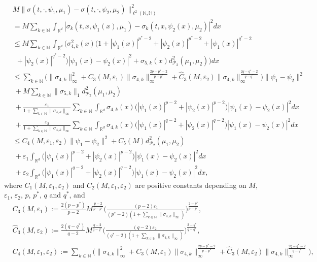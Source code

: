 \documentclass[11pt]{article}
\renewcommand{\leq}{\leqslant}
\numberwithin{equation}{section}
\begin{document}
\begin{align}\label{h2--}
&M\|\sigma(t,\cdot,\psi_1,\mu_1)-
\sigma(t,\cdot,\psi_2,\mu_2)
\|^2_{
\ell^2(\mathbb{N},
\mathbb{H})}
\nonumber\\
&=M\sum_{k\in\mathbb{N}}\int_{\mathbb{R}^d}
|\sigma_k(t,x,\psi_1(x),\mu_1)
-\sigma_k(t,x,\psi_2(x),\mu_2)|^2dx
\nonumber\\
&
\leq M\sum_{k\in\mathbb{N}}\int_{\mathbb{R}^d}
\Big(\sigma^2_{4,k}(x)\big(1+ |\psi_1(x)|^{p^*-2}+ |\psi_2(x)|^{p^*-2} +|\psi_1(x)|^{q^*-2}
\nonumber\\& \ \ +|\psi_2(x)|^{q^*-2}
\big)|\psi_1(x)-\psi_2(x)|^2 +\sigma_{5,k}(x)
d_{\mathcal{P}_2}^2(\mu_1,\mu_2)\Big)dx
\nonumber\\
&\leq
\sum_{k\in\mathbb{N}}
\Big(\|\sigma_{4,k}\|^2_{\infty}+
C_3(M,\varepsilon_1)
\|\sigma_{4,k}\|_{\infty}^{\frac{2p-p^*-2}{p-p^*}}
+\widehat{C}_3(M,\varepsilon_2)
\|\sigma_{4,k}\|_{\infty}^{\frac {2q-q^*-2}{q-q^*}}\Big)
\|\psi_1-\psi_2\|^2
\nonumber\\
&\  +M\sum_{k\in\mathbb{N}}
\|\sigma_{5,k}\|_{1}
d_{\mathcal{P}_2}^2(\mu_1,\mu_2)
\nonumber\\
&\  + \frac{\varepsilon_1}{1+ \sum_{k\in\mathbb{N}}
\|\sigma_{4,k}\|_{\infty}}\sum_{k\in\mathbb{N}}
\int_{\mathbb{R}^d}
\sigma_{4,k}(x)\big(|\psi_1(x)|^{p-2}+ |\psi_2(x)|^{p-2}\big)|\psi_1(x)-\psi_2(x)|^2dx
\nonumber\\
&\ + \frac{\varepsilon_2}{1+ \sum_{k\in\mathbb{N}}
\|\sigma_{4,k}\|_{\infty}}
\sum_{k\in\mathbb{N}}\int_{\mathbb{R}^d}
\sigma_{4,k}(x)\big(|\psi_1(x)|^{q-2}+ |\psi_2(x)|^{q-2}\big)|\psi_1(x)-\psi_2(x)|^2dx
\nonumber\\&\leq C_4(M,\varepsilon_1,\varepsilon_2)
\|\psi_1-\psi_2\|^2
 +C_5(M)
d_{\mathcal{P}_2}^2(\mu_1,\mu_2)
\nonumber\\
&\ +\varepsilon_1\int_{\mathbb{R}^d}
 \big(|\psi_1(x)|^{p-2} +|\psi_2(x)|^{p-2}
\big)|\psi_1(x)-\psi_2(x)|^2dx
\nonumber\\
&\  +\varepsilon_2\int_{\mathbb{R}^d}
 \big(|\psi_1(x)|^{q-2} +|\psi_2(x)|^{q-2}
\big)|\psi_1(x)-\psi_2(x)|^2dx,
\end{align}
where
$C_1(M,\varepsilon_1,\varepsilon_2)$ and
$C_2(M,\varepsilon_1,\varepsilon_2)$
are positive constants depending on $M$, $\varepsilon_1$, $\varepsilon_2$, $p$, $p^*$, $q$ and $q^*$, and
\begin{align*}&
C_3(M,\varepsilon_1):=\frac{2(p-p^*)}{p-2}
M^{\frac{p-2}{p-p^*}}
\bigg( \frac{(p-2)\varepsilon_1}{(p^*-2)
(1+ \sum_{k\in\mathbb{N}}
\|\sigma_{4,k}\|_{\infty}) }
\bigg)^{\frac{2-p^*}{p-p^*}},
\\&
\widehat{C}_3(M,\varepsilon_2):=
\frac{2(q-q^*)}{q-2}M^{\frac{q-2}{q-q^*}}
\bigg( \frac{(q-2)\varepsilon_2}{(q^*-2)
(1+ \sum_{k\in\mathbb{N}}
\|\sigma_{4,k}\|_{\infty}) }
\bigg)^{\frac{2-q^*}{q-q^*}},
\\&C_4(M,\varepsilon_1,\varepsilon_2):=
\sum_{k\in\mathbb{N}}
\Big(\|\sigma_{4,k}\|^2_{\infty}+
C_3(M,\varepsilon_1)
\|\sigma_{4,k}\|_{\infty}^{\frac{2p-p^*-2}{p-p^*}}
+\widehat{C}_3(M,\varepsilon_2)
\|\sigma_{4,k}\|_{\infty}^{\frac {2q-q^*-2}{q-q^*}}\Big),
\end{align*}
\end{document}
